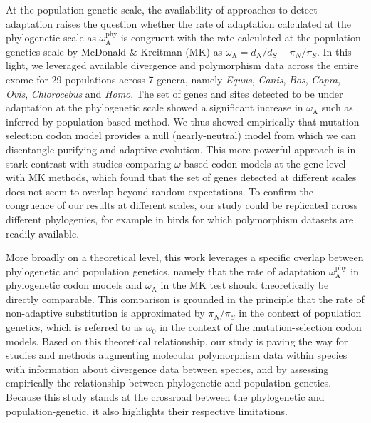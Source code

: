 \documentclass{article}
\newcommand{\dn}{d_N}
\newcommand{\ds}{d_S}
\newcommand{\dnds}{\dn / \ds}
\newcommand{\rateApop}{\omega_{\mathrm{A}}}
\newcommand{\rateAphy}{\rateApop^{\mathrm{phy}}}
\newcommand{\pn}{\pi_N}
\newcommand{\ps}{\pi_S}
\newcommand{\pnps}{\pn / \ps}
\begin{document}
    At the population-genetic scale, the availability of approaches to detect adaptation\cite{mcdonald_adaptative_1991, messer_frequent_2013} raises the question whether the rate of adaptation calculated at the phylogenetic scale as $\rateAphy$ is congruent with the rate calculated at the population genetics scale by McDonald \& Kreitman (MK)\cite{mcdonald_adaptative_1991} as $\rateApop = \dnds - \pnps$.
    In this light, we leveraged available divergence and polymorphism data across the entire exome for 29 populations across 7 genera, namely \textit{Equus}, \textit{Canis}, \textit{Bos}, \textit{Capra}, \textit{Ovis}, \textit{Chlorocebus} and \textit{Homo}.
    The set of genes and sites detected to be under adaptation at the phylogenetic scale showed a significant increase in $\rateApop$ such as inferred by population-based method.
    We thus showed empirically that mutation-selection codon model provides a null (nearly-neutral) model from which we can disentangle purifying and adaptive evolution.
    This more powerful approach is in stark contrast with studies comparing $\omega$-based codon models at the gene level with MK methods, which found that the set of genes detected at different scales does not seem to overlap beyond random expectations\cite{chen_two_2021}.
    To confirm the congruence of our results at different scales, our study could be replicated across different phylogenies, for example in birds for which polymorphism datasets are readily available.

    More broadly on a theoretical level, this work leverages a specific overlap between phylogenetic and population genetics, namely that the rate of adaptation $\rateAphy$ in phylogenetic codon models and $\rateApop$ in the MK test should theoretically be directly comparable.
    This comparison is grounded in the principle that the rate of non-adaptive substitution is approximated by $\pnps$ in the context of population genetics, which is referred to as $\omega_{0}$ in the context of the mutation-selection codon models.
    Based on this theoretical relationship, our study is paving the way for studies and methods augmenting molecular polymorphism data within species with information about divergence data between species\cite{chen_hunting_2021}, and by assessing empirically the relationship between phylogenetic and population genetics\cite{thorne_codon_2012}.
    Because this study stands at the crossroad between the phylogenetic and population-genetic, it also highlights their respective limitations.
\end{document}
